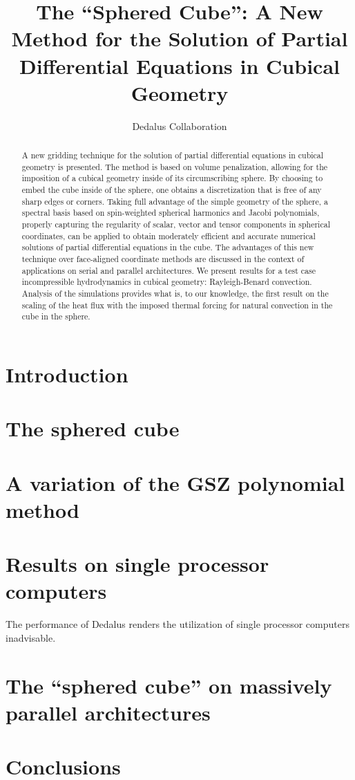 \documentclass[letterpaper, 11pt]{article}
\begin{document}
\title{The ``Sphered Cube'': A New Method for the Solution of Partial Differential Equations in Cubical Geometry}

\author{Dedalus Collaboration}

\maketitle

\begin{abstract}

A new gridding technique for the solution of partial differential equations in cubical geometry is presented.
The method is based on volume penalization, allowing for the imposition of a cubical geometry inside of its circumscribing sphere.
By choosing to embed the cube inside of the sphere, one obtains a discretization that is free of any sharp edges or corners.
Taking full advantage of the simple geometry of the sphere, a spectral basis based on spin-weighted spherical harmonics and Jacobi polynomials, properly capturing the regularity of scalar, vector and tensor components in spherical coordinates, can be applied to obtain moderately efficient and accurate numerical solutions of partial differential equations in the cube.
The advantages of this new technique over face-aligned coordinate methods are discussed in the context of applications on serial and parallel architectures.
We present results for a test case incompressible hydrodynamics in cubical geometry: Rayleigh-Benard convection.
Analysis of the simulations provides what is, to our knowledge, the first result on the scaling of the heat flux with the imposed thermal forcing for natural convection in the cube in the sphere.

\end{abstract}

\section{Introduction}

\section{The sphered cube}

\section{A variation of the GSZ polynomial method}

\section{Results on single processor computers}

The performance of Dedalus renders the utilization of single processor computers inadvisable.

\section{The ``sphered cube'' on massively parallel architectures}

\section{Conclusions}
\end{document}
